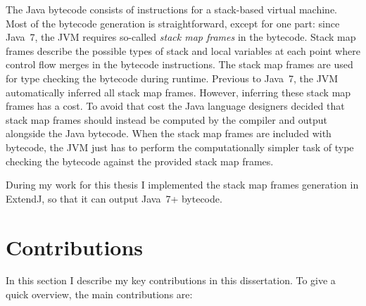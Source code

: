 \documentclass[10pt, twoside, openright]{book}
\begin{document}
The Java bytecode consists of instructions for a stack-based virtual machine. Most of the bytecode
generation is straightforward, except for one part: since Java~7, the JVM requires so-called \emph{stack
map frames} in the bytecode. Stack map frames describe the possible types of stack and local
variables at each point where control flow merges in the bytecode instructions. The stack map frames
are used for type checking the bytecode during runtime. Previous to Java~7, the JVM automatically
inferred all stack map frames. However, inferring these stack map frames has a cost.
To avoid that cost the Java language designers decided that stack map frames
should instead be computed by the compiler and output alongside the Java bytecode.
When the stack map frames are included with bytecode, the JVM just has to perform the
computationally simpler task of type checking the bytecode against the provided stack map frames.

During my work for this thesis I implemented the stack map frames generation in ExtendJ, so that it
can output Java~7+ bytecode.


\section{Contributions}
\label{sec:contributions}

In this section I describe my key contributions in this dissertation.
To give a quick overview, the main contributions are:
\end{document}
